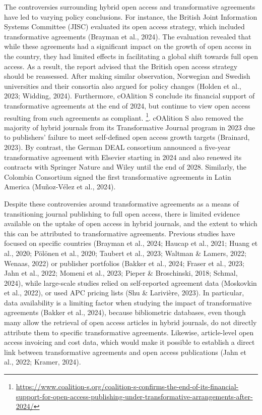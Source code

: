 \documentclass[a4paper,man,floatsintext,longtable,noextraspace,12pt]{apa6}
\begin{document}
The controversies surrounding hybrid open access and transformative
agreements have led to varying policy conclusions. For instance, the
British Joint Information Systems Committee (JISC) evaluated its open
access strategy, which included transformative agreements (Brayman et
al., 2024). The evaluation revealed that while these agreements had a
significant impact on the growth of open access in the country, they had
limited effects in facilitating a global shift towards full open access.
As a result, the report advised that the British open access strategy
should be reassessed. After making similar observation, Norwegian and
Swedish universities and their consortia also argued for policy changes
(Holden et al., 2023; Widding, 2024). Furthermore, cOAlition S conclude
its financial support of transformative agreements at the end of 2024,
but continue to view open access resulting from such agreements as
compliant. \footnote{\url{https://www.coalition-s.org/coalition-s-confirms-the-end-of-its-financial-support-for-open-access-publishing-under-transformative-arrangements-after-2024/}}.
cOAlition S also removed the majority of hybrid journals from its
Transformative Journal program in 2023 due to publishers' failure to
meet self-defined open access growth targets (Brainard, 2023). By
contrast, the German DEAL consortium announced a five-year
transformative agreement with Elsevier starting in 2024 and also renewed
its contracts with Springer Nature and Wiley until the end of 2028.
Similarly, the Colombia Consortium signed the first transformative
agreements in Latin America (Muñoz-Vélez et al., 2024).

Despite these controversies around transformative agreements as a means
of transitioning journal publishing to full open access, there is
limited evidence available on the uptake of open access in hybrid
journals, and the extent to which this can be attributed to
transformative agreements. Previous studies have focused on specific
countries (Brayman et al., 2024; Haucap et al., 2021; Huang et al.,
2020; Pölönen et al., 2020; Taubert et al., 2023; Waltman \& Lamers,
2022; Wenaas, 2022) or publisher portfolios (Bakker et al., 2024; Fraser
et al., 2023; Jahn et al., 2022; Momeni et al., 2023; Pieper \&
Broschinski, 2018; Schmal, 2024), while large-scale studies relied on
self-reported agreement data (Moskovkin et al., 2022), or used APC
pricing lists (Shu \& Larivière, 2023). In particular, data availability
is a limiting factor when studying the impact of transformative
agreements (Bakker et al., 2024), because bibliometric databases, even
though many allow the retrieval of open access articles in hybrid
journals, do not directly attribute them to specific transformative
agreements. Likewise, article-level open access invoicing and cost data,
which would make it possible to establish a direct link between
transformative agreements and open access publications (Jahn et al.,
2022; Kramer, 2024).
\end{document}
